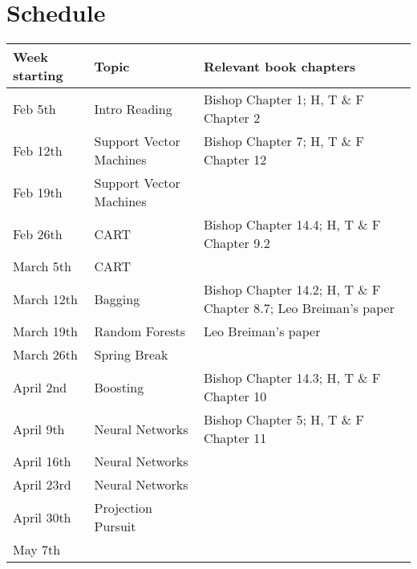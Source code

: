 \documentclass[]{article}
\begin{document}
\section{Schedule}
\begin{table}[hb!]
\begin{tabular}{llp{3.5in}}
\hline
Week starting & Topic  & Relevant book chapters\\[1ex]
\hline
 Feb 5th  &   Intro Reading    & Bishop Chapter 1; H, T \& F Chapter 2  \\[1ex]

Feb 12th   &  Support Vector Machines      & Bishop Chapter 7; H, T \& F Chapter 12  \\[1ex]

Feb 19th   &  Support Vector Machines     &   \\[1ex]

Feb 26th   &  CART    &   Bishop Chapter 14.4; H, T \& F Chapter 9.2  \\[1ex]

 March 5th  &  CART     &  \\[1ex]

March 12th   &  Bagging      & Bishop Chapter 14.2; H, T \& F Chapter 8.7; Leo Breiman's paper  \\[1ex]

March 19th   &  Random Forests     & Leo Breiman's paper  \\[1ex]

March 26th   & Spring Break &  \\[1ex]

April 2nd   &  Boosting     & Bishop Chapter 14.3; H, T \& F Chapter 10 \\[1ex]

April 9th   &  Neural Networks     &  Bishop Chapter 5;  H, T \& F Chapter 11  \\[1ex]

April 16th   &  Neural Networks      &   \\[1ex]

April 23rd   &  Neural Networks     &   \\[1ex]

April 30th   & Projection Pursuit       &   \\[1ex]

May 7th   &      &   \\

\end{tabular}
\end{table}
\end{document}
